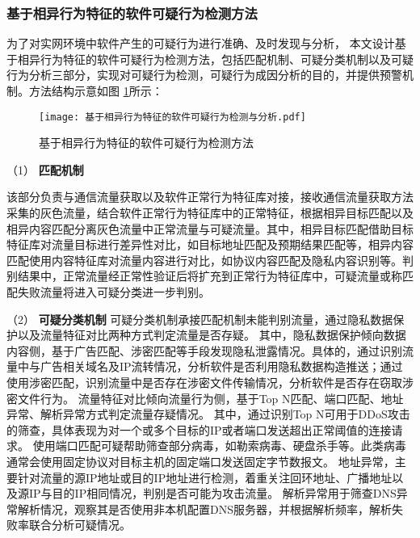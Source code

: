 \subsubsection{基于相异行为特征的软件可疑行为检测方法}

为了对实网环境中软件产生的可疑行为进行准确、及时发现与分析，
本文设计基于相异行为特征的软件可疑行为检测方法，包括匹配机制、可疑分类机制以及可疑行为分析三部分，实现对可疑行为检测，可疑行为成因分析的目的，并提供预警机制。方法结构示意如图 \ref{fig:基于相异行为特征的软件可疑行为检测方法}所示：

\FloatBarrier
 
\begin{figure}[ht]
  \centering
  \texttt{[image: 基于相异行为特征的软件可疑行为检测与分析.pdf]}
  \caption{基于相异行为特征的软件可疑行为检测方法}
  \label{fig:基于相异行为特征的软件可疑行为检测方法}
\end{figure} 

\FloatBarrier

（1） \textbf{匹配机制}\quad

该部分负责与通信流量获取以及软件正常行为特征库对接，接收通信流量获取方法采集的灰色流量，结合软件正常行为特征库中的正常特征，根据相异目标匹配以及相异内容匹配分离灰色流量中正常流量与可疑流量。其中，相异目标匹配借助目标特征库对流量目标进行差异性对比，如目标地址匹配及预期结果匹配等，相异内容匹配使用内容特征库对流量内容进行对比，如协议内容匹配及隐私内容识别等。判别结果中，正常流量经正常性验证后将扩充到正常行为特征库中，可疑流量或称匹配失败流量将进入可疑分类进一步判别。

（2） \textbf{可疑分类机制}\quad
可疑分类机制承接匹配机制未能判别流量，通过隐私数据保护以及流量特征对比两种方式判定流量是否存疑。
其中，隐私数据保护倾向数据内容侧，基于广告匹配、涉密匹配等手段发现隐私泄露情况。具体的，通过识别流量中与广告相关域名及IP流转情况，分析软件是否利用隐私数据构造推送；通过使用涉密匹配，识别流量中是否存在涉密文件传输情况，分析软件是否存在窃取涉密文件行为。
流量特征对比倾向流量行为侧，基于Top N匹配、端口匹配、地址异常、解析异常方式判定流量存疑情况。
其中，通过识别Top N可用于DDoS攻击的筛查，具体表现为对一个或多个目标的IP或者端口发送超出正常阈值的连接请求。
使用端口匹配可疑帮助筛查部分病毒，如勒索病毒、硬盘杀手等。此类病毒通常会使用固定协议对目标主机的固定端口发送固定字节数报文。
地址异常，主要针对流量的源IP地址或目的IP地址进行检测，着重关注回环地址、广播地址以及源IP与目的IP相同情况，判别是否可能为攻击流量。
解析异常用于筛查DNS异常解析情况，观察其是否使用非本机配置DNS服务器，并根据解析频率，解析失败率联合分析可疑情况。
 
